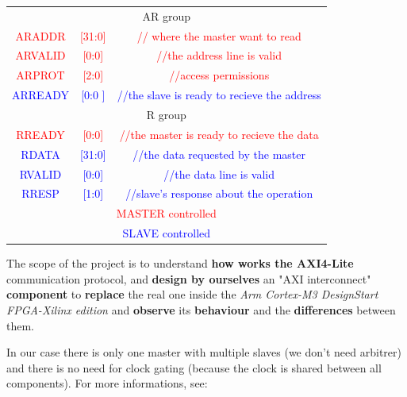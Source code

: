 \begin{tabular} {c c c}
  \multicolumn{3}{c}{{AR group}} \\
  \textcolor{Red}{\small{ARADDR}} & \textcolor{Red}{\small{[31:0]}} & \textcolor{Red}{\small{// where the master want to read}} \\
  \textcolor{Red}{\small{ARVALID}} & \textcolor{Red}{\small{[0:0]}} & \textcolor{Red}{\small{ //the address line is valid}} \\
  \textcolor{Red}{\small{ARPROT}} & \textcolor{Red}{\small{[2:0]}} & \textcolor{Red}{\small{//access permissions}} \\
  \textcolor{Blue}{\small{ARREADY}} & \textcolor{Blue}{\small{[0:0 ]}} & \textcolor{Blue}{\small{//the slave is ready to recieve the address}} \\

  \multicolumn{3}{c}{{R group}} \\
  \textcolor{Red}{\small{RREADY}} & \textcolor{Red}{\small{[0:0]}} & \textcolor{Red}{\small{//the master is ready to recieve the data}} \\
  \textcolor{Blue}{\small{RDATA}} & \textcolor{Blue}{\small{[31:0]}} & \textcolor{Blue}{\small{//the data requested by the master}} \\
  \textcolor{Blue}{\small{RVALID}} & \textcolor{Blue}{\small{[0:0]}} & \textcolor{Blue}{\small{//the data line is valid}} \\
  \textcolor{Blue}{\small{RRESP}} & \textcolor{Blue}{\small{[1:0]}} & \textcolor{Blue}{\small{//slave’s response about the operation}} \\

  \hline
  \multicolumn{3}{c}{\textcolor{Red}{MASTER controlled}} \\
  \multicolumn{3}{c}{\textcolor{Blue}{SLAVE controlled}} \\
\end{tabular}

{}

The scope of the project is to understand {\bf how works the AXI4-Lite} communication protocol, and {\bf design by ourselves} an "AXI interconnect" {\bf component} to {\bf replace} the real one inside the {\it Arm Cortex-M3 DesignStart FPGA-Xilinx edition} and {\bf observe} its {\bf behaviour} and the {\bf differences} between them.

In our case there is only one master with multiple slaves (we don't need arbitrer) and there is no need for clock gating (because the clock is shared between all components).
For more informations, see: \cite{vivadoGuide} \cite{AXISpecification}

